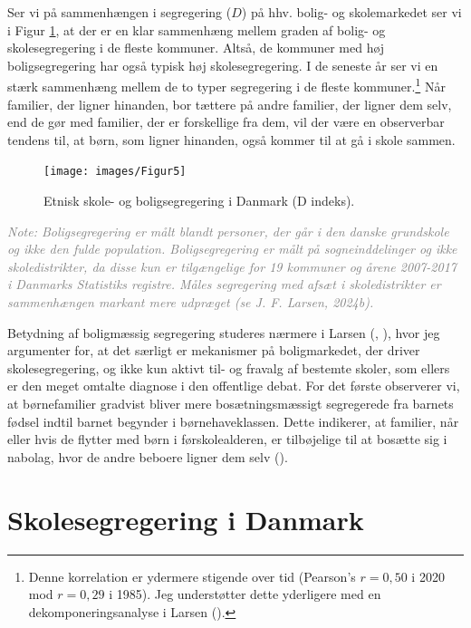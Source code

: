 \documentclass[
]{book}
\begin{document}
Ser vi på sammenhængen i segregering (\(D\)) på hhv. bolig- og skolemarkedet ser vi i Figur \ref{fig:fig-4-4}, at der er en klar sammenhæng mellem graden af bolig- og skolesegregering i de fleste kommuner. Altså, de kommuner med høj boligsegregering har også typisk høj skolesegregering. I de seneste år ser vi en stærk sammenhæng mellem de to typer segregering i de fleste kommuner.\footnote{Denne korrelation er ydermere stigende over tid (Pearson's \(r=0,50\) i 2020 mod \(r=0,29\) i 1985). Jeg understøtter dette yderligere med en dekomponeringsanalyse i Larsen ().} Når familier, der ligner hinanden, bor tættere på andre familier, der ligner dem selv, end de gør med familier, der er forskellige fra dem, vil der være en observerbar tendens til, at børn, som ligner hinanden, også kommer til at gå i skole sammen.

\begin{figure}
\texttt{[image: images/Figur5]} \caption{Etnisk skole- og boligsegregering i Danmark (D indeks).}\label{fig:fig-4-4}
\end{figure}

\begin{footnotesize}\textit{\textcolor{gray}{
Note: Boligsegregering er målt blandt personer, der går i den danske grundskole og ikke den fulde population. Boligsegregering er målt på sogneinddelinger og ikke skoledistrikter, da disse kun er tilgængelige for 19 kommuner og årene 2007-2017 i Danmarks Statistiks registre. Måles segregering med afsæt i skoledistrikter er sammenhængen markant mere udpræget (se J. F. Larsen, 2024b).
}}
\end{footnotesize}

Betydning af boligmæssig segregering studeres nærmere i Larsen (, ), hvor jeg argumenter for, at det særligt er mekanismer på boligmarkedet, der driver skolesegregering, og ikke kun aktivt til- og fravalg af bestemte skoler, som ellers er den meget omtalte diagnose i den offentlige debat. For det første observerer vi, at børnefamilier gradvist bliver mere bosætningsmæssigt segregerede fra barnets fødsel indtil barnet begynder i børnehaveklassen. Dette indikerer, at familier, når eller hvis de flytter med børn i førskolealderen, er tilbøjelige til at bosætte sig i nabolag, hvor de andre beboere ligner dem selv ().

\section{Skolesegregering i Danmark}\label{skolesegregering-i-danmark}
\end{document}
